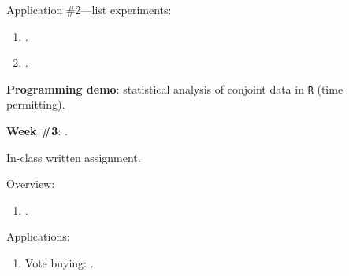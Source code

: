 \documentclass[letterpaper]{article}
\renewenvironment{itemize}{
  \begin{list}{}{
    \setlength{\leftmargin}{1.5em}
  }
}{
  \end{list}
}
\begin{document}
\begin{enumerate}
\begin{itemize}
        \item[$\diamond$] Application \#2---list experiments:

          \begin{enumerate}

              \item[$\bullet$] \href{https://doi.org/10.1093/pan/mpr048}{}.

              \item[$\bullet$] \href{https://link.springer.com/10.1057/s41269-020-00174-4}{}.


          \end{enumerate}
             \item[$\diamond$] {\bf Programming demo}: statistical analysis of conjoint data in \texttt{R} (time permitting).

      \end{itemize}


  \item {\bf Week \#3}:  {\color{ForestGreen}{\bf Lab Experiments}}.

  
  \item[{\color{red}$\diamond$}] {\color{red}In-class written assignment}.

        \begin{itemize} 

        \item[$\diamond$] Overview:

        \begin{enumerate}
          \item[$\bullet$] \href{https://doi.org/10.1017/gov.2018.14}{}.

          
        \end{enumerate}

       \item[$\diamond$] Applications:



           \begin{enumerate}

           \item[$\bullet$] Vote buying: \href{https://doi.org/10.1016/j.electstud.2022.102497}{}.


\end{enumerate}
\end{itemize}
\end{enumerate}
\end{document}

